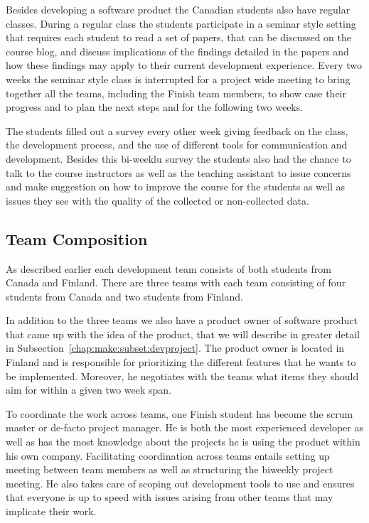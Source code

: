 Besides developing a software product the Canadian students also have regular classes.
During a regular class the students participate in a seminar style setting that requires each student to read a set of papers, that can be discussed on the course blog, and discuss implications of the findings detailed in the papers and how these findings may apply to their current development experience.
Every two weeks the seminar style class is interrupted for a project wide meeting to bring together all the teams, including the Finish team members, to show case their progress and to plan the next steps and for the following two weeks.

The students filled out a survey every other week giving feedback on the class, the development process, and the use of different tools for communication and development.
Besides this bi-weeklu survey the students also had the chance to talk to the course instructors as well as the teaching assistant to issue concerns and make suggestion on how to improve the course for the students as well as issues they see with the quality of the collected or non-collected data.

\subsection{Team Composition}
As described earlier each development team consists of both students from Canada and Finland.
There are three teams with each team consisting of four students from Canada and two students from Finland.

In addition to the three teams we also have a product owner of software product that came up with the idea of the product, that we will describe in greater detail in Subsection~\ref{chap:make:subset:devproject}.
The product owner is located in Finland and is responsible for prioritizing the different features that he wants to be implemented.
Moreover, he negotiates with the teams what items they should aim for within a given two week span. 

To coordinate the work across teams, one Finish student has become the scrum master or de-facto project manager.
He is both the most experienced developer as well as has the most knowledge about the projects he is using the product within his own company.
Facilitating coordination across teams entails setting up meeting between team members as well as structuring the biweekly project meeting.
He also takes care of scoping out development tools to use and ensures that everyone is up to speed with issues arising from other teams that may implicate their work.

